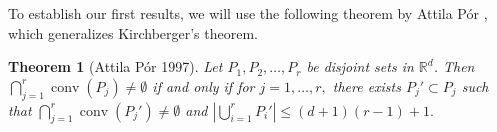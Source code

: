\documentclass[11pt,a4paper]{article}
\theoremstyle{plain}
\newtheorem{theorem}{Theorem}[section]
\newtheorem{lemma}[theorem]{Lemma}
\theoremstyle{definition}
\newtheorem{definition}{Definition}
\newcommand{\rr}{\mathds{R}}
\newcommand{\conv}{\operatorname{conv}}
\newcommand{\tv}{\operatorname{Tv}}
\begin{document}










To establish our first results, we will use the following theorem by Attila P\'{o}r \cite{attilaphd}, which generalizes Kirchberger's theorem.

\begin{theorem}[Attila P\'{o}r \cite{attilaphd} 1997]\label{Por}
Let $P_1,P_2,\dots,P_r$ be disjoint sets in $\rr^d$. Then $\bigcap_{j=1}^r \conv(P_j)\neq \emptyset$ if and only if for 
$j=1,\dots,r, $ there exists $P_j'\subset P_j$ such that 
$\bigcap_{j=1}^r \conv(P_j' )\neq \emptyset$ and $\left|\bigcup_{i=1}^r P_i'\right|\leq (d+1)(r-1)+1.$
\end{theorem}


\end{document}
